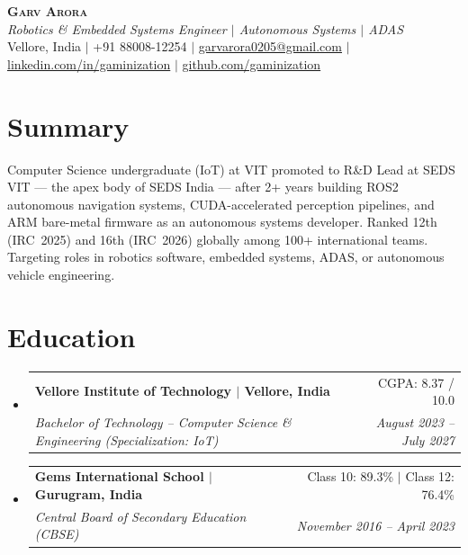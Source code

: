 \documentclass[letterpaper,10pt]{article}
\makeatletter
\newcommand{\resumeSubheading}[4]{
  \vspace{-4pt}\item
    \begin{tabular*}{0.97\textwidth}[t]{l@{\extracolsep{\fill}}r}
      \textbf{#1} & #2 \\
      \textit{\small#3} & \textit{\small #4} \\
    \end{tabular*}\vspace{-8pt}
}
\newcommand{\resumeSubHeadingListStart}{\begin{itemize}[leftmargin=0.15in, label={}]}
\newcommand{\resumeSubHeadingListEnd}{\end{itemize}}
\makeatother
\begin{document}
\begin{center}
    \textbf{\Huge \scshape Garv Arora} \\ \vspace{2pt}
    \small \textit{Robotics \& Embedded Systems Engineer $|$ Autonomous Systems $|$ ADAS} \\ \vspace{2pt}
    \small Vellore, India $|$
    +91 88008-12254 $|$
    \href{mailto:garvarora0205@gmail.com}{garvarora0205@gmail.com} $|$
    \href{https://linkedin.com/in/gaminization}{linkedin.com/in/gaminization} $|$
    \href{https://github.com/gaminization}{github.com/gaminization}
\end{center}


\section{Summary}
\vspace{1pt}
\small{Computer Science undergraduate (IoT) at VIT promoted to R\&D Lead at SEDS VIT --- the apex body of SEDS India --- after 2+ years building ROS2 autonomous navigation systems, CUDA-accelerated perception pipelines, and ARM bare-metal firmware as an autonomous systems developer. Ranked 12th (IRC~2025) and 16th (IRC~2026) globally among 100+ international teams. Targeting roles in robotics software, embedded systems, ADAS, or autonomous vehicle engineering.}


\section{Education}
  \resumeSubHeadingListStart
    \resumeSubheading
      {Vellore Institute of Technology $|$ Vellore, India}{CGPA: 8.37 / 10.0}
      {Bachelor of Technology -- Computer Science \& Engineering (Specialization: IoT)}{August 2023 -- July 2027}
    \resumeSubheading
      {Gems International School $|$ Gurugram, India}{Class 10: 89.3\% $|$ Class 12: 76.4\%}
      {Central Board of Secondary Education (CBSE)}{November 2016 -- April 2023}
  \resumeSubHeadingListEnd


\end{document}
